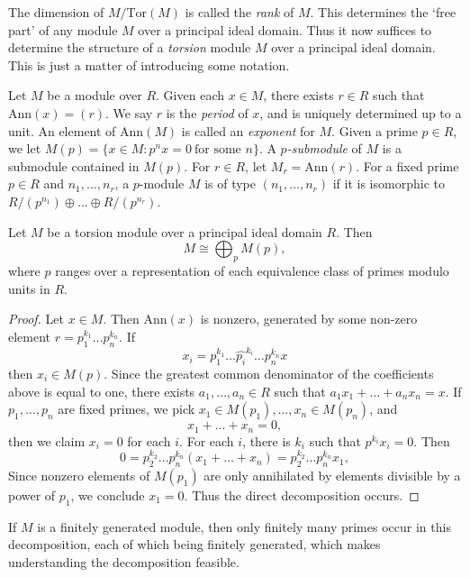 The dimension of $M/\text{Tor}(M)$ is called the \emph{rank} of $M$. This determines the `free part' of any module $M$ over a principal ideal domain. Thus it now suffices to determine the structure of a \emph{torsion} module $M$ over a principal ideal domain. This is just a matter of introducing some notation.

Let $M$ be a module over $R$. Given each $x \in M$, there exists $r \in R$ such that $\text{Ann}(x) = (r)$. We say $r$ is the \emph{period} of $x$, and is uniquely determined up to a unit. An element of $\text{Ann}(M)$ is called an \emph{exponent} for $M$. Given a prime $p \in R$, we let $M(p) = \{ x \in M: p^n x = 0\ \text{for some $n$} \}$. A \emph{$p$-submodule} of $M$ is a submodule contained in $M(p)$. For $r \in R$, let $M_r = \text{Ann}(r)$. For a fixed prime $p \in R$ and $n_1, \dots, n_r$, a $p$-module $M$ is of type $(n_1,\dots,n_r)$ if it is isomorphic to $R/(p^{n_1}) \oplus \dots \oplus R/(p^{n_r})$.

\begin{lemma}
    Let $M$ be a torsion module over a principal ideal domain $R$. Then
    \[ M \cong \bigoplus_p M(p), \]
    where $p$ ranges over a representation of each equivalence class of primes modulo units in $R$.
\end{lemma}
\begin{proof}
    Let $x \in M$. Then $\text{Ann}(x)$ is nonzero, generated by some non-zero element $r = p_1^{k_1} \dots p_n^{k_n}$. If
    \[ x_i = p_1^{k_1} \dots \widehat{p_i}^{k_i} \dots p_n^{k_n} x \]
    then $x_i \in M(p)$. Since the greatest common denominator of the coefficients above is equal to one, there exists $a_1,\dots,a_n \in R$ such that $a_1x_1 + \dots + a_nx_n = x$. If $p_1,\dots,p_n$ are fixed primes, we pick $x_1 \in M(p_1), \dots, x_n \in M(p_n)$, and
    \[ x_1 + \dots + x_n = 0, \] 
    then we claim $x_i = 0$ for each $i$. For each $i$, there is $k_i$ such that $p^{k_i}x_i = 0$. Then
    \[ 0 = p_2^{k_2} \dots p_n^{k_n}(x_1 + \dots + x_n) = p_2^{k_2} \dots p_n^{k_n} x_1, \]
    Since nonzero elements of $M(p_1)$ are only annihilated by elements divisible by a power of $p_1$, we conclude $x_1 = 0$. Thus the direct decomposition occurs.
\end{proof}

\begin{remark}
    If $M$ is a finitely generated module, then only finitely many primes occur in this decomposition, each of which being finitely generated, which makes understanding the decomposition feasible.
\end{remark}

